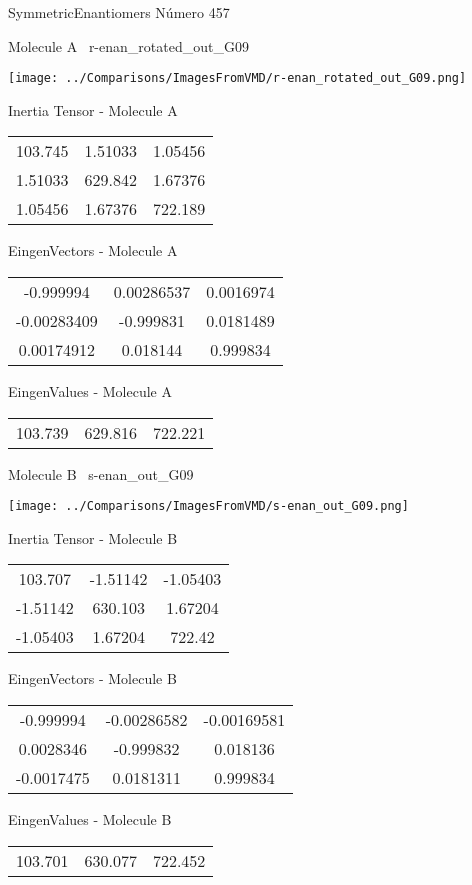 \vtab[-3cm]
\begin{center}
{\large SymmetricEnantiomers \tab Número 457}
\end{center}
\begin{multicols}{2}
\begin{center}

Molecule A \
r-enan\_rotated\_out\_G09

\texttt{[image: ../Comparisons/ImagesFromVMD/r-enan\_rotated\_out\_G09.png]}

Inertia Tensor - Molecule A \\
\begin{tabular}{|c c c|}
103.745	 & 	1.51033	 & 	1.05456	 \\
1.51033	 & 	629.842	 & 	1.67376	 \\
1.05456	 & 	1.67376	 & 	722.189
\end{tabular}

\vtab
 EingenVectors - Molecule A     \\
\begin{tabular}{|c c c|}
-0.999994	 & 	0.00286537	 & 	0.0016974	 \\
-0.00283409	 & 	-0.999831	 & 	0.0181489	 \\
0.00174912	 & 	0.018144	 & 	0.999834
\end{tabular}

\vtab
 EingenValues - Molecule A     \\
\begin{tabular}{|c c c|}
103.739	 & 	629.816	 & 	722.221	 \\
\end{tabular}
\columnbreak

Molecule B \
s-enan\_out\_G09

\texttt{[image: ../Comparisons/ImagesFromVMD/s-enan\_out\_G09.png]}

Inertia Tensor - Molecule B \\
\begin{tabular}{|c c c|}
103.707	 & 	-1.51142	 & 	-1.05403	 \\
-1.51142	 & 	630.103	 & 	1.67204	 \\
-1.05403	 & 	1.67204	 & 	722.42
\end{tabular}

\vtab
 EingenVectors - Molecule B     \\
\begin{tabular}{|c c c|}
-0.999994	 & 	-0.00286582	 & 	-0.00169581	 \\
0.0028346	 & 	-0.999832	 & 	0.018136	 \\
-0.0017475	 & 	0.0181311	 & 	0.999834
\end{tabular}

\vtab
 EingenValues - Molecule B     \\
\begin{tabular}{|c c c|}
103.701	 & 	630.077	 & 	722.452	 \\
\end{tabular}

\end{center}
\end{multicols}

